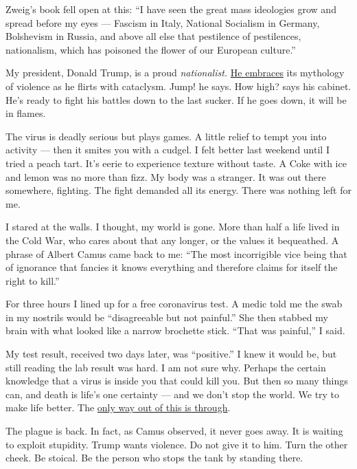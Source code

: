 Zweig's book fell open at this: ``I have seen the great mass ideologies
grow and spread before my eyes --- Fascism in Italy, National Socialism
in Germany, Bolshevism in Russia, and above all else that pestilence of
pestilences, nationalism, which has poisoned the flower of our European
culture.''

My president, Donald Trump, is a proud \emph{nationalist.}
\href{https://www.nytimes3xbfgragh.onion/2020/08/31/us/politics/trump-police-protests.html}{He
embraces} its mythology of violence as he flirts with cataclysm. Jump!
he says. How high? says his cabinet. He's ready to fight his battles
down to the last sucker. If he goes down, it will be in flames.

The virus is deadly serious but plays games. A little relief to tempt
you into activity --- then it smites you with a cudgel. I felt better
last weekend until I tried a peach tart. It's eerie to experience
texture without taste. A Coke with ice and lemon was no more than fizz.
My body was a stranger. It was out there somewhere, fighting. The fight
demanded all its energy. There was nothing left for me.

I stared at the walls. I thought, my world is gone. More than half a
life lived in the Cold War, who cares about that any longer, or the
values it bequeathed. A phrase of Albert Camus came back to me: ``The
most incorrigible vice being that of ignorance that fancies it knows
everything and therefore claims for itself the right to kill.''

For three hours I lined up for a free coronavirus test. A medic told me
the swab in my nostrils would be ``disagreeable but not painful.'' She
then stabbed my brain with what looked like a narrow brochette stick.
``That was painful,'' I said.

My test result, received two days later, was ``positive.'' I knew it
would be, but still reading the lab result was hard. I am not sure why.
Perhaps the certain knowledge that a virus is inside you that could kill
you. But then so many things can, and death is life's one certainty ---
and we don't stop the world. We try to make life better. The
\href{https://www.nytimes3xbfgragh.onion/2020/04/03/opinion/coronavirus-pandemic.html}{only
way out of this is through}.

The plague is back. In fact, as Camus observed, it never goes away. It
is waiting to exploit stupidity. Trump wants violence. Do not give it to
him. Turn the other cheek. Be stoical. Be the person who stops the tank
by standing there.

